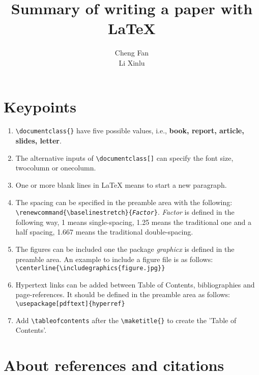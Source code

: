 \documentclass[14pt]{article}
\begin{document}
\title{Summary of writing a paper with \LaTeX}
\author{Cheng Fan\\ Li Xinlu}
\date{}
\maketitle

\tableofcontents

\section{Keypoints} \label{Keys}

\begin{enumerate}
 \item \texttt{\textbackslash documentclass\{\}} have five possible values, i.e., \textbf{book, report, article, slides, letter}.
 
 \item The alternative inputs of \texttt{\textbackslash documentclass[]} can specify the font size, twocolumn or onecolumn.

 \item One or more blank lines in \LaTeX{} means to start a new paragraph.
 
 \item The spacing can be specified in the preamble area with the following: \texttt{\textbackslash renewcommand\{\textbackslash baselinestretch\}\{\emph{Factor}\}}. \emph{Factor} is defined in the following way, 1 means single-spacing, 1.25 means the traditional one and a half spacing, 1.667 means the traditional double-spacing.
 
 \item The figures can be included one the package \emph{graphicx} is defined in the preamble area. An example to include a figure file is as follows: \texttt{\textbackslash centerline\{\textbackslash includegraphics\{figure.jpg\}\}}
 
 \item Hypertext links can be added between Table of Contents, bibliographies and page-references. It should be defined in the preamble area as follows: \texttt{\textbackslash usepackage[pdftext]\{hyperref\}}
 
 \item Add \texttt{\textbackslash tableofcontents} after the \texttt{\textbackslash maketitle\{\}} to create the 'Table of Contents'.

\end{enumerate}


\section{About references and citations}
\end{document}
